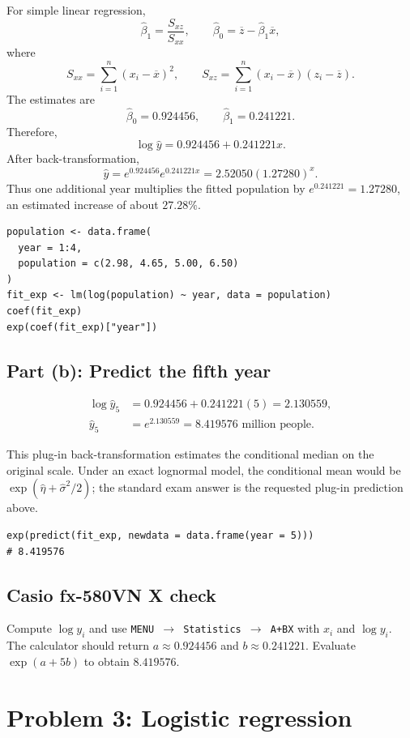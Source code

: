 ﻿\documentclass[11pt]{article}
\begin{document}
For simple linear regression,
\[
  \widehat\beta_1=\frac{S_{xz}}{S_{xx}},
  \qquad
  \widehat\beta_0=\overline z-\widehat\beta_1\overline x,
\]
where
\[
  S_{xx}=\sum_{i=1}^n(x_i-\overline x)^2,
  \qquad
  S_{xz}=\sum_{i=1}^n(x_i-\overline x)(z_i-\overline z).
\]
The estimates are
\[
  \boxed{\widehat\beta_0=0.924456,
  \qquad \widehat\beta_1=0.241221.}
\]
Therefore,
\[
  \boxed{\log\widehat y=0.924456+0.241221x.}
\]
After back-transformation,
\[
  \widehat y
  =e^{0.924456}e^{0.241221x}
  =2.52050(1.27280)^x.
\]
Thus one additional year multiplies the fitted population by
$e^{0.241221}=1.27280$, an estimated increase of about $27.28\%$.

\begin{lstlisting}
population <- data.frame(
  year = 1:4,
  population = c(2.98, 4.65, 5.00, 6.50)
)
fit_exp <- lm(log(population) ~ year, data = population)
coef(fit_exp)
exp(coef(fit_exp)["year"])
\end{lstlisting}

\subsection{Part (b): Predict the fifth year}

\begin{align*}
\log\widehat y_5
&=0.924456+0.241221(5)=2.130559,\\
\widehat y_5
&=e^{2.130559}=\boxed{8.419576\text{ million people}.}
\end{align*}

This plug-in back-transformation estimates the conditional median on the
original scale. Under an exact lognormal model, the conditional mean would be
$\exp(\widehat\eta+\widehat\sigma^2/2)$; the standard exam answer is the
requested plug-in prediction above.

\begin{lstlisting}
exp(predict(fit_exp, newdata = data.frame(year = 5)))
# 8.419576
\end{lstlisting}

\subsection*{Casio fx-580VN X check}

Compute $\log y_i$ and use \texttt{MENU $\to$ Statistics $\to$ A+BX} with
$x_i$ and $\log y_i$. The calculator should return
$a\approx0.924456$ and $b\approx0.241221$. Evaluate
$\exp(a+5b)$ to obtain $8.419576$.

\section{Problem 3: Logistic regression}
\end{document}
